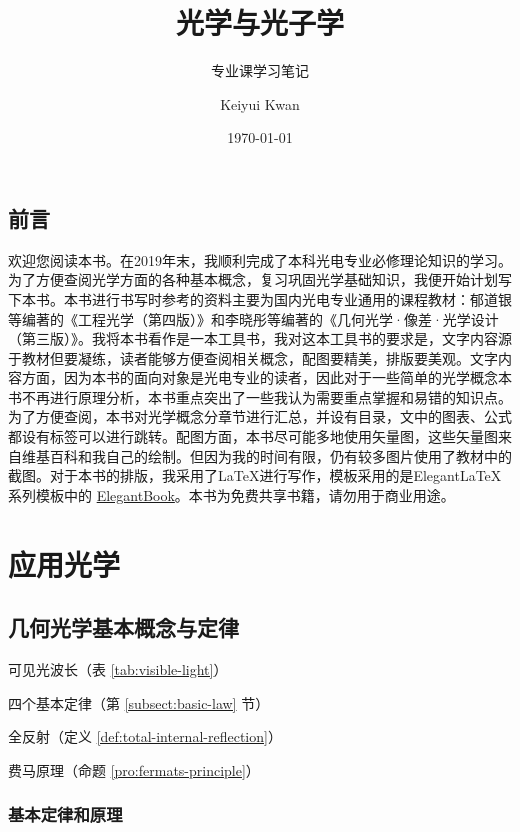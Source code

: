 \documentclass[cn,10pt,chinesefont=founder,math=newtx,cite=super,twoside]{elegantbook}
\title{光学与光子学}
\subtitle{专业课学习笔记}
\author{Keiyui Kwan}
\institute{Zhejiang University}
\date{\today}
\begin{document}
	
\maketitle
\frontmatter
	
\chapter*{前言}
欢迎您阅读本书。在2019年末，我顺利完成了本科光电专业必修理论知识的学习。为了方便查阅光学方面的各种基本概念，复习巩固光学基础知识，我便开始计划写下本书。本书进行书写时参考的资料主要为国内光电专业通用的课程教材：郁道银等编著的《工程光学（第四版）》和李晓彤等编著的《几何光学·像差·光学设计（第三版）》。我将本书看作是一本工具书，我对这本工具书的要求是，文字内容源于教材但要凝练，读者能够方便查阅相关概念，配图要精美，排版要美观。文字内容方面，因为本书的面向对象是光电专业的读者，因此对于一些简单的光学概念本书不再进行原理分析，本书重点突出了一些我认为需要重点掌握和易错的知识点。为了方便查阅，本书对光学概念分章节进行汇总，并设有目录，文中的图表、公式都设有标签可以进行跳转。配图方面，本书尽可能多地使用矢量图，这些矢量图来自维基百科和我自己的绘制。但因为我的时间有限，仍有较多图片使用了教材中的截图。对于本书的排版，我采用了\LaTeX 进行写作，模板采用的是Elegant\LaTeX 系列模板中的 \href{https://github.com/ElegantLaTeX/ElegantBook}{ElegantBook}。本书为免费共享书籍，请勿用于商业用途。

\tableofcontents
\mainmatter

\part{应用光学}

\chapter{几何光学基本概念与定律}

\begin{introduction}
	\item 可见光波长（表 \ref{tab:visible-light}）
	\item 四个基本定律（第 \ref{subsect:basic-law} 节）
	\item 全反射（定义 \ref{def:total-internal-reflection}）
	\item 费马原理（命题 \ref{pro:fermats-principle}）
\end{introduction}

\section{基本定律和原理}
\end{document}

